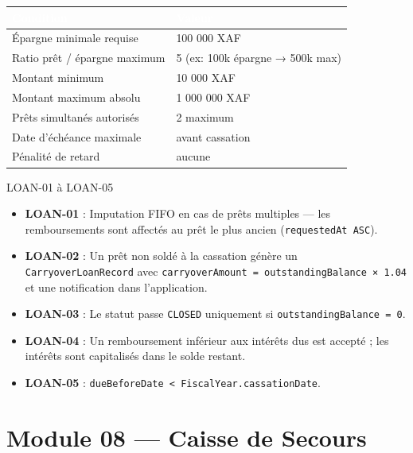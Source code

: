 \documentclass[12pt, a4paper]{report}
\begin{document}
\begin{center}
\begin{tabular}{L{6cm}R{6cm}}
  \toprule
  \textcolor{white}{\textbf{Condition}} &
  \textcolor{white}{\textbf{Valeur}} \\
  \midrule
  Épargne minimale requise         & 100 000 XAF \\
  Ratio prêt / épargne maximum     & 5 (ex: 100k épargne → 500k max) \\
  Montant minimum                  & 10 000 XAF \\
  Montant maximum absolu           & 1 000 000 XAF \\
  Prêts simultanés autorisés       & 2 maximum \\
  Date d'échéance maximale         & avant cassation \\
  Pénalité de retard               & aucune \\
  \bottomrule
\end{tabular}
\end{center}

\begin{invariantBox}{LOAN-01 à LOAN-05}
\begin{itemize}
  \item \textbf{LOAN-01} : Imputation FIFO en cas de prêts multiples — les remboursements sont affectés
        au prêt le plus ancien (\texttt{requestedAt ASC}).
  \item \textbf{LOAN-02} : Un prêt non soldé à la cassation génère un \texttt{CarryoverLoanRecord}
        avec \texttt{carryoverAmount = outstandingBalance × 1.04} et une notification dans l'application.
  \item \textbf{LOAN-03} : Le statut passe \texttt{CLOSED} uniquement si \texttt{outstandingBalance = 0}.
  \item \textbf{LOAN-04} : Un remboursement inférieur aux intérêts dus est accepté ; les intérêts
        sont capitalisés dans le solde restant.
  \item \textbf{LOAN-05} : \texttt{dueBeforeDate < FiscalYear.cassationDate}.
\end{itemize}
\end{invariantBox}

\section{Module 08 — Caisse de Secours}
\end{document}
